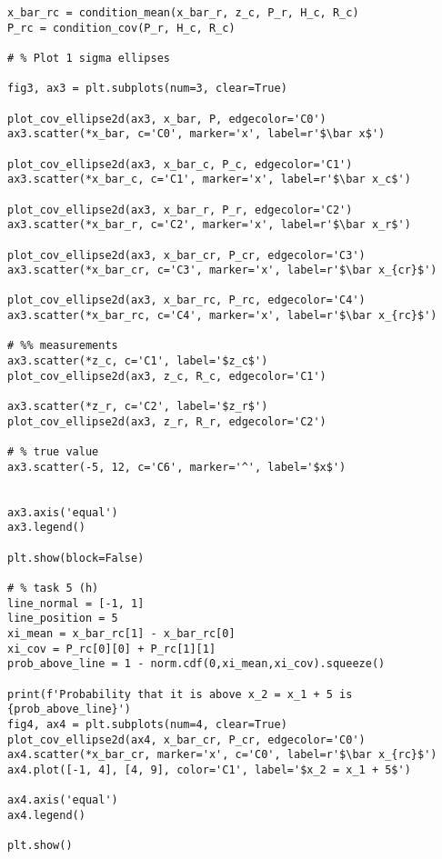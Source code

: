 \documentclass[11pt]{article}
\begin{document}
\begin{verbatim}
x_bar_rc = condition_mean(x_bar_r, z_c, P_r, H_c, R_c)
P_rc = condition_cov(P_r, H_c, R_c)

# % Plot 1 sigma ellipses

fig3, ax3 = plt.subplots(num=3, clear=True)

plot_cov_ellipse2d(ax3, x_bar, P, edgecolor='C0')
ax3.scatter(*x_bar, c='C0', marker='x', label=r'$\bar x$')

plot_cov_ellipse2d(ax3, x_bar_c, P_c, edgecolor='C1')
ax3.scatter(*x_bar_c, c='C1', marker='x', label=r'$\bar x_c$')

plot_cov_ellipse2d(ax3, x_bar_r, P_r, edgecolor='C2')
ax3.scatter(*x_bar_r, c='C2', marker='x', label=r'$\bar x_r$')

plot_cov_ellipse2d(ax3, x_bar_cr, P_cr, edgecolor='C3')
ax3.scatter(*x_bar_cr, c='C3', marker='x', label=r'$\bar x_{cr}$')

plot_cov_ellipse2d(ax3, x_bar_rc, P_rc, edgecolor='C4')
ax3.scatter(*x_bar_rc, c='C4', marker='x', label=r'$\bar x_{rc}$')

# %% measurements
ax3.scatter(*z_c, c='C1', label='$z_c$')
plot_cov_ellipse2d(ax3, z_c, R_c, edgecolor='C1')

ax3.scatter(*z_r, c='C2', label='$z_r$')
plot_cov_ellipse2d(ax3, z_r, R_r, edgecolor='C2')

# % true value
ax3.scatter(-5, 12, c='C6', marker='^', label='$x$')


ax3.axis('equal')
ax3.legend()

plt.show(block=False)

# % task 5 (h)
line_normal = [-1, 1]
line_position = 5
xi_mean = x_bar_rc[1] - x_bar_rc[0]
xi_cov = P_rc[0][0] + P_rc[1][1]
prob_above_line = 1 - norm.cdf(0,xi_mean,xi_cov).squeeze()

print(f'Probability that it is above x_2 = x_1 + 5 is {prob_above_line}')
fig4, ax4 = plt.subplots(num=4, clear=True)
plot_cov_ellipse2d(ax4, x_bar_cr, P_cr, edgecolor='C0')
ax4.scatter(*x_bar_cr, marker='x', c='C0', label=r'$\bar x_{rc}$')
ax4.plot([-1, 4], [4, 9], color='C1', label='$x_2 = x_1 + 5$')

ax4.axis('equal')
ax4.legend()

plt.show()
\end{verbatim}
\end{document}
